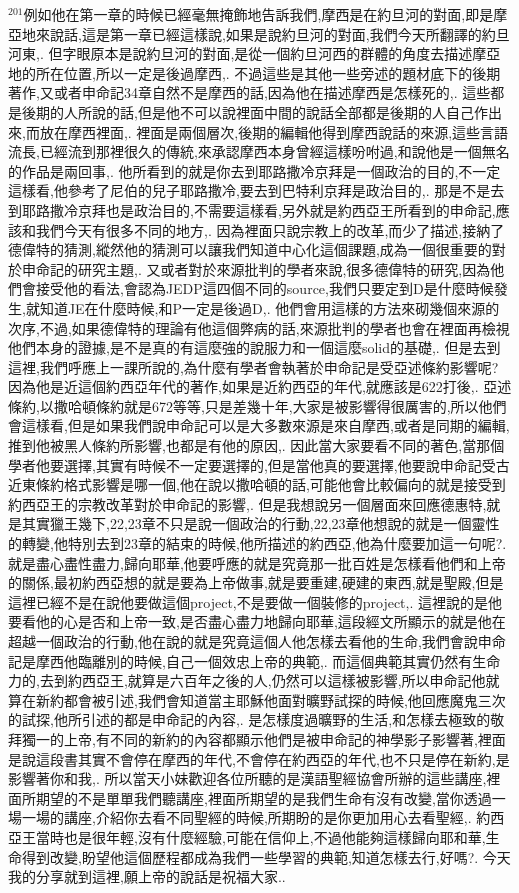 \documentclass{book}
\begin{document}
$^{201}$例如他在第一章的時候已經毫無掩飾地告訴我們,摩西是在約旦河的對面,即是摩亞地來說話,這是第一章已經這樣說,如果是說約旦河的對面,我們今天所翻譯的約旦河東,.
但字眼原本是說約旦河的對面,是從一個約旦河西的群體的角度去描述摩亞地的所在位置,所以一定是後過摩西,.
不過這些是其他一些旁述的題材底下的後期著作,又或者申命記34章自然不是摩西的話,因為他在描述摩西是怎樣死的,.
這些都是後期的人所說的話,但是他不可以說裡面中間的說話全部都是後期的人自己作出來,而放在摩西裡面,.
裡面是兩個層次,後期的編輯他得到摩西說話的來源,這些言語流長,已經流到那裡很久的傳統,來承認摩西本身曾經這樣吩咐過,和說他是一個無名的作品是兩回事,.
他所看到的就是你去到耶路撒冷京拜是一個政治的目的,不一定這樣看,他參考了尼伯的兒子耶路撒冷,要去到巴特利京拜是政治目的,.
那是不是去到耶路撒冷京拜也是政治目的,不需要這樣看,另外就是約西亞王所看到的申命記,應該和我們今天有很多不同的地方,.
因為裡面只說宗教上的改革,而少了描述,接納了德偉特的猜測,縱然他的猜測可以讓我們知道中心化這個課題,成為一個很重要的對於申命記的研究主題,.
又或者對於來源批判的學者來說,很多德偉特的研究,因為他們會接受他的看法,會認為JEDP這四個不同的source,我們只要定到D是什麼時候發生,就知道JE在什麼時候,和P一定是後過D,.
他們會用這樣的方法來砌幾個來源的次序,不過,如果德偉特的理論有他這個弊病的話,來源批判的學者也會在裡面再檢視他們本身的證據,是不是真的有這麼強的說服力和一個這麼solid的基礎,.
但是去到這裡,我們呼應上一課所說的,為什麼有學者會執著於申命記是受亞述條約影響呢?因為他是近這個約西亞年代的著作,如果是近約西亞的年代,就應該是622打後,.
亞述條約,以撒哈頓條約就是672等等,只是差幾十年,大家是被影響得很厲害的,所以他們會這樣看,但是如果我們說申命記可以是大多數來源是來自摩西,或者是同期的編輯,推到他被黑人條約所影響,也都是有他的原因,.
因此當大家要看不同的著色,當那個學者他要選擇,其實有時候不一定要選擇的,但是當他真的要選擇,他要說申命記受古近東條約格式影響是哪一個,他在說以撒哈頓的話,可能他會比較偏向的就是接受到約西亞王的宗教改革對於申命記的影響,.
但是我想說另一個層面來回應德惠特,就是其實獵王幾下,22,23章不只是說一個政治的行動,22,23章他想說的就是一個靈性的轉變,他特別去到23章的結束的時候,他所描述的約西亞,他為什麼要加這一句呢?.
就是盡心盡性盡力,歸向耶華,他要呼應的就是究竟那一批百姓是怎樣看他們和上帝的關係,最初約西亞想的就是要為上帝做事,就是要重建,硬建的東西,就是聖殿,但是這裡已經不是在說他要做這個project,不是要做一個裝修的project,.
這裡說的是他要看他的心是否和上帝一致,是否盡心盡力地歸向耶華,這段經文所顯示的就是他在超越一個政治的行動,他在說的就是究竟這個人他怎樣去看他的生命,我們會說申命記是摩西他臨離別的時候,自己一個效忠上帝的典範,.
而這個典範其實仍然有生命力的,去到約西亞王,就算是六百年之後的人,仍然可以這樣被影響,所以申命記他就算在新約都會被引述,我們會知道當主耶穌他面對曠野試探的時候,他回應魔鬼三次的試探,他所引述的都是申命記的內容,.
是怎樣度過曠野的生活,和怎樣去極致的敬拜獨一的上帝,有不同的新約的內容都顯示他們是被申命記的神學影子影響著,裡面是說這段書其實不會停在摩西的年代,不會停在約西亞的年代,也不只是停在新約,是影響著你和我,.
所以當天小妹歡迎各位所聽的是漢語聖經協會所辦的這些講座,裡面所期望的不是單單我們聽講座,裡面所期望的是我們生命有沒有改變,當你透過一場一場的講座,介紹你去看不同聖經的時候,所期盼的是你更加用心去看聖經,.
約西亞王當時也是很年輕,沒有什麼經驗,可能在信仰上,不過他能夠這樣歸向耶和華,生命得到改變,盼望他這個歷程都成為我們一些學習的典範,知道怎樣去行,好嗎?.
今天我的分享就到這裡,願上帝的說話是祝福大家..
\newpage
\end{document}
